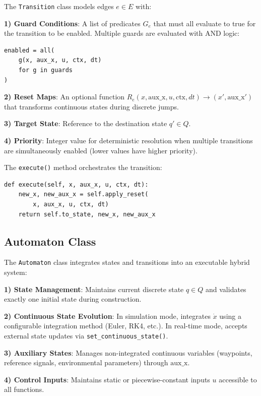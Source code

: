 \documentclass[conference]{IEEEtran}
\begin{document}
The \texttt{Transition} class models edges $e \in E$ with:

\textbf{1) Guard Conditions}: A list of predicates $G_e$ that must all evaluate to true for the transition to be enabled. Multiple guards are evaluated with AND logic:
\begin{lstlisting}[caption={Guard Evaluation}]
enabled = all(
    g(x, aux_x, u, ctx, dt) 
    for g in guards
)
\end{lstlisting}

\textbf{2) Reset Maps}: An optional function $R_e(x, \text{aux\_x}, u, \text{ctx}, dt) \rightarrow (x', \text{aux\_x}')$ that transforms continuous states during discrete jumps.

\textbf{3) Target State}: Reference to the destination state $q' \in Q$.

\textbf{4) Priority}: Integer value for deterministic resolution when multiple transitions are simultaneously enabled (lower values have higher priority).

The \texttt{execute()} method orchestrates the transition:
\begin{lstlisting}[caption={Transition Execution}]
def execute(self, x, aux_x, u, ctx, dt):
    new_x, new_aux_x = self.apply_reset(
        x, aux_x, u, ctx, dt)
    return self.to_state, new_x, new_aux_x
\end{lstlisting}

\subsection{Automaton Class}

The \texttt{Automaton} class integrates states and transitions into an executable hybrid system:

\textbf{1) State Management}: Maintains current discrete state $q \in Q$ and validates exactly one initial state during construction.

\textbf{2) Continuous State Evolution}: In simulation mode, integrates $\dot{x}$ using a configurable integration method (Euler, RK4, etc.). In real-time mode, accepts external state updates via \texttt{set\_continuous\_state()}.

\textbf{3) Auxiliary States}: Manages non-integrated continuous variables (waypoints, reference signals, environmental parameters) through $\text{aux\_x}$.

\textbf{4) Control Inputs}: Maintains static or piecewise-constant inputs $u$ accessible to all functions.
\end{document}
